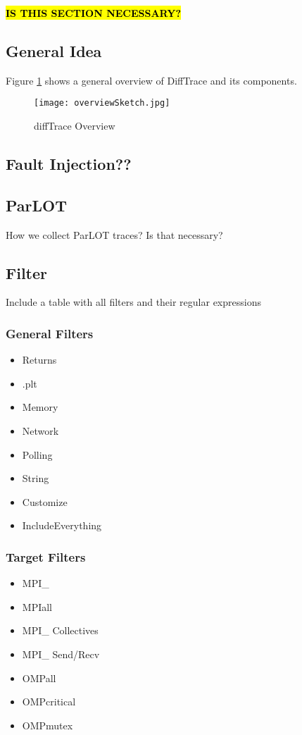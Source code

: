 \textbf{\hl{IS THIS SECTION NECESSARY?}}

\subsection{General Idea}

Figure \ref{fig.diffTraceOverview} shows a general overview of DiffTrace and its components.

\begin{figure}[t]
\caption{diffTrace Overview}
\texttt{[image: overviewSketch.jpg]}
\label{fig.diffTraceOverview}
\end{figure}


\subsection{Fault Injection??}
\subsection{ParLOT}
How we collect ParLOT traces? Is that necessary?
\subsection{Filter}
Include a table with all filters and their regular expressions
\subsubsection{General Filters}
\begin{itemize}
\item Returns
\item .plt
\item Memory
\item Network
\item Polling
\item String
\item Customize
\item IncludeEverything
\end{itemize}
\subsubsection{Target Filters}
\begin{itemize}
\item MPI\_
\item MPIall
\item MPI\_ Collectives
\item MPI\_ Send/Recv
\item OMPall
\item OMPcritical
\item OMPmutex
\end{itemize}

